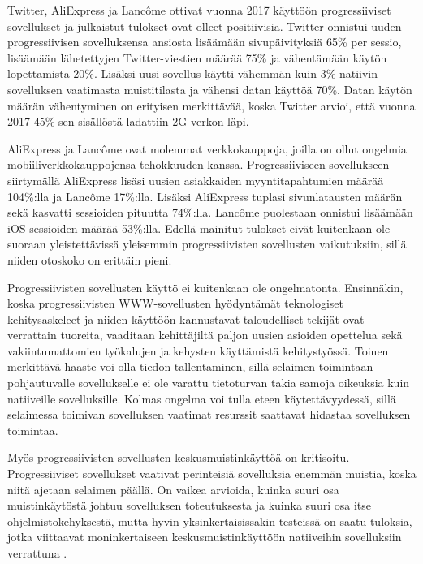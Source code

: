 \documentclass[utf8]{gradu3}
\begin{document}
Twitter, AliExpress ja Lancôme ottivat vuonna 2017 käyttöön progressiiviset sovellukset ja julkaistut tulokset ovat olleet positiivisia. Twitter onnistui uuden progressiivisen sovelluksensa ansiosta lisäämään sivupäivityksiä 65\% per sessio, lisäämään lähetettyjen Twitter-viestien määrää 75\% ja vähentämään käytön lopettamista 20\%. Lisäksi uusi sovellus käytti vähemmän kuin 3\% natiivin sovelluksen vaatimasta muistitilasta ja vähensi datan käyttöä 70\%. Datan käytön määrän vähentyminen on erityisen merkittävää, koska Twitter arvioi, että vuonna 2017 45\% sen sisällöstä ladattiin 2G-verkon läpi. \parencite[]{beginners-guide-pwa}

AliExpress ja Lancôme ovat molemmat verkkokauppoja, joilla on ollut ongelmia mobiiliverkkokauppojensa tehokkuuden kanssa. Progressiiviseen sovellukseen siirtymällä AliExpress lisäsi uusien asiakkaiden myyntitapahtumien määrää 104\%:lla ja Lancôme 17\%:lla. Lisäksi AliExpress tuplasi sivunlatausten määrän sekä kasvatti sessioiden pituutta 74\%:lla. Lancôme puolestaan onnistui lisäämään iOS-sessioiden määrää 53\%:lla. \parencite[]{beginners-guide-pwa} Edellä mainitut tulokset eivät kuitenkaan ole suoraan yleistettävissä yleisemmin progressiivisten sovellusten vaikutuksiin, sillä niiden otoskoko on erittäin pieni.

Progressiivisten sovellusten käyttö ei kuitenkaan ole ongelmatonta. Ensinnäkin, koska progressiivisten WWW-sovellusten hyödyntämät teknologiset kehitysaskeleet ja niiden käyttöön kannustavat taloudelliset tekijät ovat verrattain tuoreita, vaaditaan kehittäjiltä paljon uusien asioiden opettelua sekä vakiintumattomien työkalujen ja kehysten käyttämistä kehitystyössä. Toinen merkittävä haaste voi olla tiedon tallentaminen, sillä selaimen toimintaan pohjautuvalle sovellukselle ei ole varattu tietoturvan takia samoja oikeuksia kuin natiiveille sovelluksille. Kolmas ongelma voi tulla eteen käytettävyydessä, sillä selaimessa toimivan sovelluksen vaatimat resurssit saattavat hidastaa sovelluksen toimintaa. \parencite[]{pwa-design-challenges}

Myös progressiivisten sovellusten keskusmuistinkäyttöä on kritisoitu. Progressiiviset sovellukset vaativat perinteisiä sovelluksia enemmän muistia, koska niitä ajetaan selaimen päällä. On vaikea arvioida, kuinka suuri osa muistinkäytöstä johtuu sovelluksen toteutuksesta ja kuinka suuri osa itse ohjelmistokehyksestä, mutta hyvin yksinkertaisissakin testeissä on saatu tuloksia, jotka viittaavat moninkertaiseen keskusmuistinkäyttöön natiiveihin sovelluksiin verrattuna \parencite[]{electron-memory-usage}.
\end{document}
